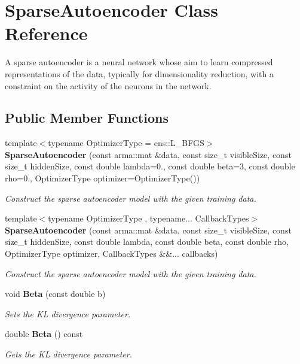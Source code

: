 \section{Sparse\+Autoencoder Class Reference}
\label{classmlpack_1_1nn_1_1SparseAutoencoder}


A sparse autoencoder is a neural network whose aim to learn compressed representations of the data, typically for dimensionality reduction, with a constraint on the activity of the neurons in the network.  


\subsection*{Public Member Functions}
\begin{DoxyCompactItemize}
\item 
{\footnotesize template$<$typename Optimizer\+Type  = ens\+::\+L\+\_\+\+B\+F\+GS$>$ }\\\textbf{ Sparse\+Autoencoder} (const arma\+::mat \&data, const size\+\_\+t visible\+Size, const size\+\_\+t hidden\+Size, const double lambda=0., const double beta=3, const double rho=0., Optimizer\+Type optimizer=Optimizer\+Type())
\begin{DoxyCompactList}\small\item\em Construct the sparse autoencoder model with the given training data. \end{DoxyCompactList}\item 
{\footnotesize template$<$typename Optimizer\+Type , typename... Callback\+Types$>$ }\\\textbf{ Sparse\+Autoencoder} (const arma\+::mat \&data, const size\+\_\+t visible\+Size, const size\+\_\+t hidden\+Size, const double lambda, const double beta, const double rho, Optimizer\+Type optimizer, Callback\+Types \&\&... callbacks)
\begin{DoxyCompactList}\small\item\em Construct the sparse autoencoder model with the given training data. \end{DoxyCompactList}\item 
void \textbf{ Beta} (const double b)
\begin{DoxyCompactList}\small\item\em Sets the KL divergence parameter. \end{DoxyCompactList}\item 
double \textbf{ Beta} () const
\begin{DoxyCompactList}\small\item\em Gets the KL divergence parameter. \end{DoxyCompactList}\item 

\end{DoxyCompactItemize}
